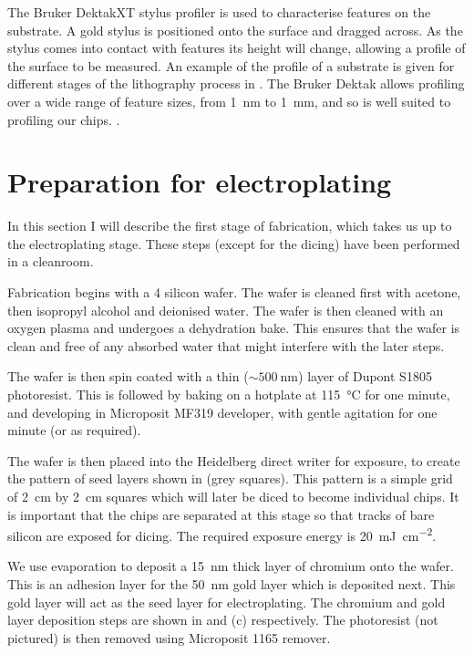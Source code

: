 The Bruker DektakXT stylus profiler is used to characterise features on the
substrate. A gold stylus is positioned onto the surface and dragged across. As
the stylus comes into contact with features its height will change, allowing a
profile of the surface to be measured. An example of the profile of a substrate
is given for different stages of the lithography process in
. The Bruker Dektak allows profiling over a wide
range of feature sizes, from \SI{1}{\nano\meter} to \SI{1}{\milli\meter}, and
so is well suited to profiling our chips.
%
.


\section{Preparation for electroplating}
\label{fab:prep}

In this section I will describe the first stage of fabrication, which takes us
up to the electroplating stage. These steps (except for the dicing) have been
performed in a cleanroom.

Fabrication begins with a \SI{4}{\inch} silicon wafer. The wafer is cleaned first
with acetone, then isopropyl alcohol and deionised water. The wafer is then
cleaned with an oxygen plasma and undergoes a dehydration bake.  This ensures
that the wafer is clean and free of any absorbed water that might
interfere with the later steps.

The wafer is then spin coated with a thin ($\sim\SI{500}{\nano\meter}$) layer
of Dupont S1805 photoresist. This is followed by baking on a hotplate at
\SI{115}{\celsius} for one minute, and developing in Microposit MF319
developer, with gentle agitation for one minute (or as required).

The wafer is then placed into the Heidelberg direct writer for exposure, to
create the pattern of seed layers shown in  (grey
squares). This pattern is a simple grid of \SI{2}{\centi\meter} by
\SI{2}{\centi\meter} squares which will later be diced to become individual
chips.  It is important that the chips are separated at this stage so that
tracks of bare silicon are exposed for dicing. The required exposure energy is
\SI{20}{\milli\joule\per\centi\meter\squared}.

We use evaporation to deposit a \SI{15}{\nano\meter} thick layer of chromium onto the
wafer. This is an adhesion layer for the \SI{50}{\nano\meter} gold layer which is
deposited next. This gold layer will act as the seed layer for electroplating.
The chromium and gold layer deposition steps are shown in
 and (c) respectively. The photoresist (not
pictured) is then removed using Microposit 1165 remover.

